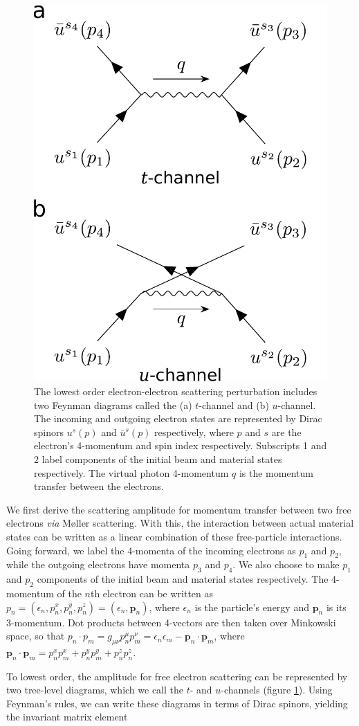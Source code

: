 \documentclass[twoside,twocolumn,9pt]{article}
\begin{document}
\begin{figure}
  \centering
  \includegraphics[width=.4\textwidth]{figures/tu_portrait.pdf}
  \caption{
    The lowest order electron-electron scattering perturbation includes two
    Feynman diagrams called the (a) $t$-channel and (b) $u$-channel.
    The incoming and outgoing electron states are represented by Dirac spinors
    $u^s(p)$ and $\bar{u}^s(p)$ respectively, where $p$ and $s$ are the electron's
    4-momentum and spin index respectively.
    Subscripts 1 and 2 label components of the initial beam and material states
    respectively.
    The virtual photon 4-momentum $q$ is the momentum transfer between the
    electrons.
  }
\label{fig:tu}
\end{figure}

We first derive the scattering amplitude for momentum transfer between two free
electrons \textit{via} M{\o}ller scattering. \cite{Moller1932, Kragh1992,
Roqu1992}
With this, the interaction between actual material states can be written as a
linear combination of these free-particle interactions.
Going forward, we label the 4-momenta of the incoming electrons as $p_1$ and
$p_2$, while the outgoing electrons have momenta $p_3$ and $p_4$.
We also choose to make $p_1$ and $p_2$ components of the initial beam and
material states respectively.
The 4-momentum of the $n$th electron can be written as
$p_n = (\epsilon_n, p_n^x, p_n^y, p_n^z) = (\epsilon_n, \mathbf{p}_n)$,
where $\epsilon_n$ is the particle's energy and $\mathbf{p}_n$ is its
3-momentum.
Dot products between 4-vectors are then taken over Minkowski space, so that
$p_n\cdot p_m
=
g_{\mu\nu}p_n^\mu p_m^\nu
=
\epsilon_n\epsilon_m -
\mathbf{p}_n\cdot\mathbf{p}_m$,
where
$\mathbf{p}_n\cdot\mathbf{p}_m
=
p_n^xp_m^x + p_n^yp_m^y + p_n^zp_n^z$.   

To lowest order, the amplitude for free electron scattering can be represented
by two tree-level diagrams, which we call the $t$- and $u$-channels (figure
\ref{fig:tu}).
Using Feynman's rules, \cite{Peskin1995, Lancaster2014} we can write these
diagrams in terms of Dirac spinors, yielding the invariant matrix element
\end{document}
